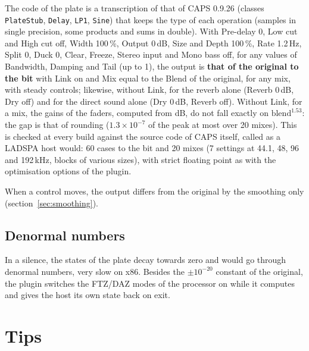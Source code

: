 \documentclass[a4paper,11pt]{article}
\newcommand{\dB}{\,dB}
\begin{document}
The code of the plate is a transcription of that of CAPS 0.9.26 (classes \texttt{PlateStub},
\texttt{Delay}, \texttt{LP1}, \texttt{Sine}) that keeps the type of each operation (samples in
single precision, some products and sums in double). With Pre-delay 0, Low cut and High cut
off, Width 100\,\%, Output 0\dB, Size and Depth 100\,\%, Rate 1.2\,Hz, Split 0, Duck 0, Clear, Freeze,
Stereo input and Mono bass off, for any values of Bandwidth, Damping and Tail (up to 1), the
output is \textbf{that of the original to the bit} with Link on and Mix equal to the Blend of
the original, for any mix, with steady controls; likewise, without Link, for the reverb alone
(Reverb 0\dB, Dry off) and for the direct sound alone (Dry 0\dB, Reverb off). Without Link, for
a mix, the gains of the faders, computed from dB, do not fall exactly on
$\mathrm{blend}^{1.53}$: the gap is that of rounding ($1.3\times10^{-7}$ of the peak at most over
20 mixes). This is checked at every build against the source code of CAPS itself, called as a
LADSPA host would: 60 cases to the bit and 20 mixes (7 settings at 44.1, 48, 96 and 192\,kHz,
blocks of various sizes), with strict floating point as with the optimisation options of the
plugin.

When a control moves, the output differs from the original by the smoothing only
(section~\ref{sec:smoothing}).

\subsection{Denormal numbers}

In a silence, the states of the plate decay towards zero and would go through denormal numbers,
very slow on x86. Besides the $\pm 10^{-20}$ constant of the original, the plugin switches the
FTZ/DAZ modes of the processor on while it computes and gives the host its own state back on
exit.

\section{Tips}
\end{document}
